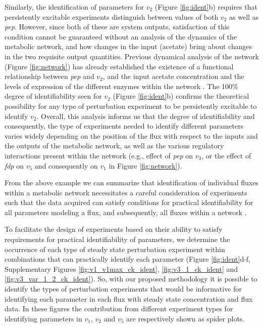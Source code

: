 \documentclass[10pt]{article}
\begin{document}
	Similarly, the identification of parameters for $v_2$ (Figure \ref{fig:ident}b) requires that persistently excitable experiments distinguish between values of both $v_2$ as well as \textit{pep}. However, since both of these are system outputs, satisfaction of this condition cannot be guaranteed without an analysis of the dynamics of the metabolic network, and how changes in the input (acetate) bring about changes in the two requisite output quantities. Previous dynamical analysis of the network (Figure \ref{fig:network}) has already established the existence of a functional relationship between \textit{pep} and $v_2$, and the input acetate concentration and the levels of expression of the different enzymes within the network \parencite{Srinivasan2017}. The 100\% degree of identifiability seen for $v_2$ (Figure \ref{fig:ident}b) confirms the theoretical possibility for any type of perturbation experiment to be persistently excitable to identify $v_2$. Overall, this analysis informs us that the degree of identifiability and consequently, the type of experiments needed to identify different parameters varies widely depending on the position of the flux with respect to the inputs and the outputs of the metabolic network, as well as the various regulatory interactions present within the network (e.g., effect of \textit{pep} on $v_3$, or the effect of \textit{fdp} on $v_5$ and consequently on $v_1$ in Figure \ref{fig:network}). 	
	
	From the above example we can summarize that identification of individual fluxes within a metabolic network necessitates a careful consideration of experiments such that the data acquired can satisfy conditions for practical identifiability for all parameters modeling a flux, and subsequently, all fluxes within a network \parencite{Heijnen2013}. 
	
	To facilitate the design of experiments based on their ability to satisfy requirements for practical identifiability of parameters, we determine the occurrence of each type of steady state perturbation experiment within combinations that can practically identify each parameter (Figure \ref{fig:ident}d-f, Supplementary Figures \ref{fig:v1_v1max_ck_ident},  \ref{fig:v3_1_ck_ident} and \ref{fig:v3_var_1_2_ck_ident}). So, with our proposed methodology it is possible to identify the types of perturbation experiments that would be informative for identifying each parameter in each flux with steady state concentration and flux data. In these figures the contribution from different experiment types for identifying parameters in $v_1$, $v_2$ and $v_5$ are respectively shown as spider plots. 
	
\end{document}
